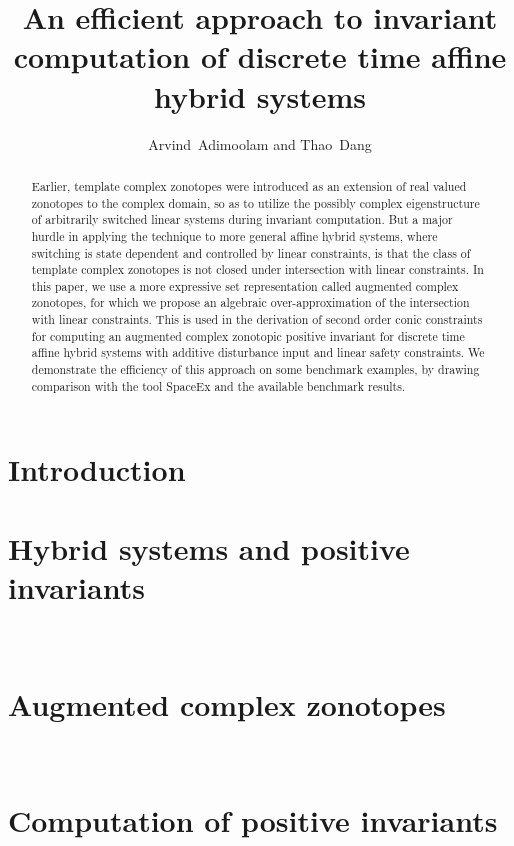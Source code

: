 \documentclass{llncs}
\title{An efficient approach to invariant computation of discrete time affine hybrid systems
}
\author{Arvind\ Adimoolam and Thao\ Dang
}
\institute{\ Verimag,~Grenoble, France\\ \url{{santosh.adimoolam,thao.dang}@univ-grenoble-alpes.fr}.
}
\begin{document}
\maketitle

\begin{abstract}
Earlier, template complex zonotopes were introduced as an extension of
real valued zonotopes to the complex domain, so as to utilize the
possibly complex eigenstructure of arbitrarily switched linear systems
during invariant computation.  But a major hurdle in applying the
technique to more general affine hybrid systems, where switching is
state dependent and controlled by linear constraints, is that the
class of template complex zonotopes is not closed under intersection
with linear constraints.  In this paper, we use a more expressive set
representation called augmented complex zonotopes, for which we
propose an algebraic over-approximation of the intersection with
linear constraints.  This is used in the derivation of second order
conic constraints for computing an augmented complex zonotopic
positive invariant for discrete time affine hybrid systems with
additive disturbance input and linear safety constraints.  We
demonstrate the efficiency of this approach on some benchmark
examples, by drawing comparison with the tool SpaceEx and the
available benchmark results.
\end{abstract}

\section{Introduction}


\section{Hybrid systems and positive invariants}~\label{sec:system}




\section{Augmented complex zonotopes}~\label{sec:acz}




\section{Computation of positive invariants}~\label{sec:invcomp}

\end{document}
